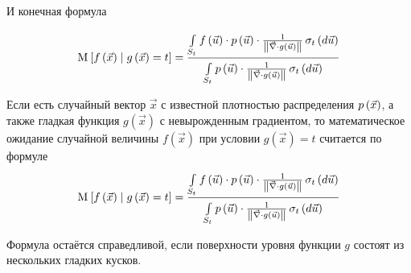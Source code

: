 И конечная формула

$$\Mean{ f\left( \vec{x} \right) \mid g\left( \vec{x} \right) = t }
    = \frac{\integrall{S_t}{\sigma_{t}\left(d\vec{u} \right)}{
        f\left( \vec{u} \right) \cdot \pdf{\vec{u}} \cdot \frac{1}{
            \left\| \vec{\nabla} \cdot g\left( \vec{u} \right) \right\|}}}
        {\integrall{S_t}{\sigma_{t}\left(d\vec{u} \right)}{
            \pdf{\vec{u}} \cdot \frac{1}{
                \left\| \vec{\nabla} \cdot g\left( \vec{u} \right) \right\|}}}$$

\begin{theorem}
    \label{conditionalExpectationDefinition}
    Если есть случайный вектор $\vec{x}$ с известной плотностью распределения
    $\pdf{\vec{x}}$, а также гладкая функция $g\left( \vec{x} \right)$
    с невырожденным градиентом, то математическое ожидание случайной величины
    $f\left( \vec{x} \right)$ при условии $g\left( \vec{x} \right) = t$
    считается по формуле
    $$\Mean{f\left( \vec{x} \right) \mid g\left( \vec{x} \right) = t}
        = \frac{\integrall{S_t}{\sigma_{t}\left(d\vec{u} \right)}{
            f\left( \vec{u} \right) \cdot \pdf{\vec{u}} \cdot \frac{1}{
                \left\| \vec{\nabla} \cdot g\left( \vec{u} \right) \right\|}}}
            {\integrall{S_t}{\sigma_{t}\left(d\vec{u} \right)}{
                \pdf{\vec{u}} \cdot \frac{1}{
                    \left\| \vec{\nabla}
                        \cdot g\left( \vec{u} \right) \right\|}}}$$
\end{theorem}

\begin{remark}
    Формула остаётся справедливой,
    если поверхности уровня функции $g$ состоят из нескольких гладких кусков.
\end{remark}
